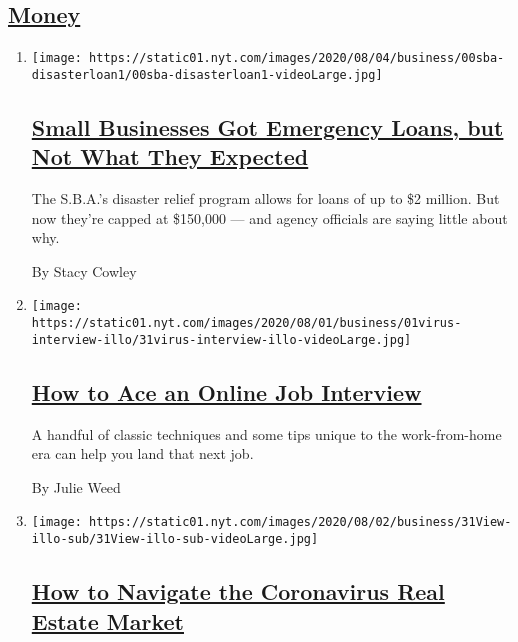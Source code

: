 \hypertarget{money}{%
\subsection{\texorpdfstring{\protect\hyperlink{}{Money}}{Money}}\label{money}}

\begin{enumerate}
\def\labelenumi{\arabic{enumi}.}
\item
  \texttt{[image: https://static01.nyt.com/images/2020/08/04/business/00sba-disasterloan1/00sba-disasterloan1-videoLarge.jpg]}

  \hypertarget{small-businesses-got-emergency-loans-but-not-what-they-expected}{%
  \subsection{\texorpdfstring{\href{/2020/08/03/business/small-business-loans-coronavirus.html}{Small
  Businesses Got Emergency Loans, but Not What They
  Expected}}{Small Businesses Got Emergency Loans, but Not What They Expected}}\label{small-businesses-got-emergency-loans-but-not-what-they-expected}}

  The S.B.A.'s disaster relief program allows for loans of up to \$2
  million. But now they're capped at \$150,000 --- and agency officials
  are saying little about why.

  By Stacy Cowley
\item
  \texttt{[image: https://static01.nyt.com/images/2020/08/01/business/01virus-interview-illo/31virus-interview-illo-videoLarge.jpg]}

  \hypertarget{how-to-ace-an-online-job-interview}{%
  \subsection{\texorpdfstring{\href{/2020/08/03/business/online-job-interview-tips.html}{How
  to Ace an Online Job
  Interview}}{How to Ace an Online Job Interview}}\label{how-to-ace-an-online-job-interview}}

  A handful of classic techniques and some tips unique to the
  work-from-home era can help you land that next job.

  By Julie Weed
\item
  \texttt{[image: https://static01.nyt.com/images/2020/08/02/business/31View-illo-sub/31View-illo-sub-videoLarge.jpg]}

  \hypertarget{how-to-navigate-the-coronavirus-real-estate-market}{%
  \subsection{\texorpdfstring{\href{/2020/07/31/business/housing-market-prices-risk.html}{How
  to Navigate the Coronavirus Real Estate
  Market}}{How to Navigate the Coronavirus Real Estate Market}}\label{how-to-navigate-the-coronavirus-real-estate-market}}


\end{enumerate}
